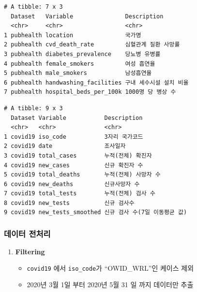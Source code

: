 \documentclass[
  11pt,
]{krantz}
\providecommand{\tightlist}{%
  \setlength{\itemsep}{0pt}\setlength{\parskip}{0pt}}
\begin{document}
\begin{verbatim}
# A tibble: 7 x 3
  Dataset   Variable               Description            
  <chr>     <chr>                  <chr>                  
1 pubhealth location               국가명                 
2 pubhealth cvd_death_rate         심혈관계 질환 사망률   
3 pubhealth diabetes_prevalence    당뇨병 유병률          
4 pubhealth female_smokers         여성 흡연율            
5 pubhealth male_smokers           남성흡연율             
6 pubhealth handwashing_facilities 구내 세수시설 설치 비율
7 pubhealth hospital_beds_per_100k 1000명 당 병상 수      
\end{verbatim}

\begin{verbatim}
# A tibble: 9 x 3
  Dataset Variable           Description                  
  <chr>   <chr>              <chr>                        
1 covid19 iso_code           3자리 국가코드               
2 covid19 date               조사일자                     
3 covid19 total_cases        누적(전체) 확진자            
4 covid19 new_cases          신규 확진자 수               
5 covid19 total_deaths       누적(전체) 사망자 수         
6 covid19 new_deaths         신규사망자 수                
7 covid19 total_tests        누적(전체) 검사 수           
8 covid19 new_tests          신규 검사수                  
9 covid19 new_tests_smoothed 신규 검사 수(7일 이동평균 값)
\end{verbatim}

\normalsize

\hypertarget{ggplot-data-preprocessing}{%
\subsubsection*{데이터 전처리}\label{ggplot-data-preprocessing}}


\begin{enumerate}
\def\labelenumi{\arabic{enumi}.}
\tightlist
\item
  \textbf{Filtering}

  \begin{itemize}
  \tightlist
  \item
    \texttt{covid19} 에서 \texttt{iso\_code}가 ``OWID\_WRL''인 케이스 제외
  \item
    2020년 3월 1일 부터 2020년 5월 31 일 까지 데이터만 추출
  \end{itemize}
\end{enumerate}

\footnotesize
\end{document}
